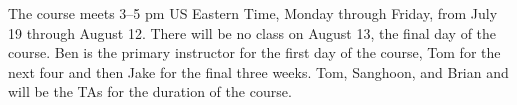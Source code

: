 The course meets 3--5 pm US Eastern Time, Monday through Friday, from July 19 through August
12. There will be no class on August 13, the final day of the course.  Ben is
the primary instructor for the first day of the course, Tom for the next four
and then Jake for the final three weeks. Tom,  Sanghoon, and Brian and will be
the TAs for the duration of the course.


